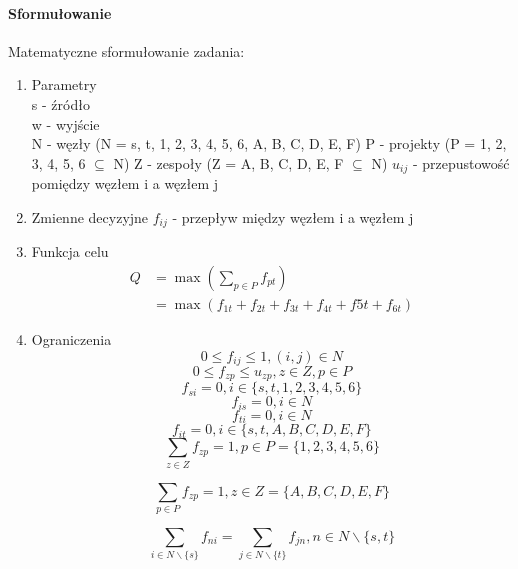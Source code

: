 \paragraph{Sformułowanie}
Matematyczne sformułowanie zadania:
\begin{enumerate}
\item Parametry \\
s - źródło \\
w - wyjście \\
N - węzły (N = {s, t, 1, 2, 3, 4, 5, 6, A, B, C, D, E, F})
P - projekty (P = {1, 2, 3, 4, 5, 6} $\subseteq$ N)
Z - zespoły (Z = {A, B, C, D, E, F} $\subseteq$ N)
$u_{ij}$ - przepustowość pomiędzy węzłem i a węzłem j
\item Zmienne decyzyjne
$f_{ij}$ - przepływ między węzłem i a węzłem j
\item Funkcja celu
\begin{align*}
    Q &= \max\left(\sum_{p \in P} f_{pt} \right) \\
    &= \max(f_{1t} + f_{2t} + f_{3t} + f_{4t} + f{5t} + f_{6t})
\end{align*}

\item Ograniczenia
\setcounter{equation}{0}
\begin{equation}
0 \leq f_{ij} \leq 1, (i, j) \in N
\end{equation}
\begin{equation}
0 \leq f_{zp} \leq u_{zp}, z \in Z, p \in P
\end{equation}
\begin{equation}
f_{si} = 0, i \in \{ s, t, 1, 2, 3, 4, 5, 6 \}
\end{equation}
\begin{equation}
f_{is} = 0, i \in N
\end{equation}
\begin{equation}
f_{ti} = 0, i \in N
\end{equation}
\begin{equation}
f_{it} = 0, i \in \{s, t, A, B, C, D, E, F\}
\end{equation}
\begin{equation}
\sum_{z \in Z} f_{zp} = 1, p \in P = \{ 1, 2, 3, 4, 5, 6 \}
\end{equation}

\begin{equation}
\sum_{p \in P} f_{zp} = 1, z \in Z = \{ A, B, C, D, E, F \}
\end{equation}

\begin{equation}
\sum_{i \in N \backslash \{s\}} f_{ni} = \sum_{j \in N \backslash \{t\}} f_{jn}, n \in N \backslash \{ s, t \}
\end{equation}



\end{enumerate}


